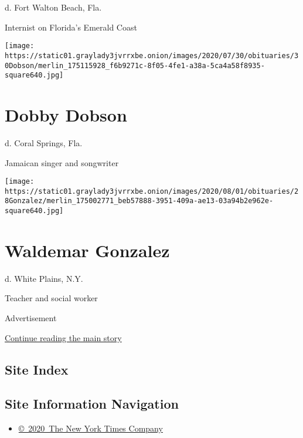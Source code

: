 d. Fort Walton Beach, Fla.

Internist on Florida's Emerald Coast

\texttt{[image: https://static01.graylady3jvrrxbe.onion/images/2020/07/30/obituaries/30Dobson/merlin\_175115928\_f6b9271c-8f05-4fe1-a38a-5ca4a58f8935-square640.jpg]}

\hypertarget{dobby-dobson}{%
\section{Dobby Dobson}\label{dobby-dobson}}

d. Coral Springs, Fla.

Jamaican singer and songwriter

\texttt{[image: https://static01.graylady3jvrrxbe.onion/images/2020/08/01/obituaries/28Gonzalez/merlin\_175002771\_beb57888-3951-409a-ae13-03a94b2e962e-square640.jpg]}

\hypertarget{waldemar-gonzalez}{%
\section{Waldemar Gonzalez}\label{waldemar-gonzalez}}

d. White Plains, N.Y.

Teacher and social worker

Advertisement

\protect\hyperlink{after-bottom}{Continue reading the main story}

\hypertarget{site-index}{%
\subsection{Site Index}\label{site-index}}

\hypertarget{site-information-navigation}{%
\subsection{Site Information
Navigation}\label{site-information-navigation}}

\begin{itemize}
\tightlist
\item
  \href{https://help.nytimes3xbfgragh.onion/hc/en-us/articles/115014792127-Copyright-notice}{©~2020~The
  New York Times Company}
\end{itemize}

